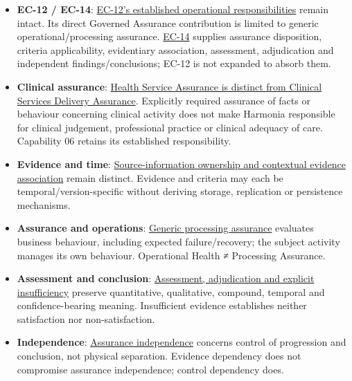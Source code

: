\begin{itemize}

\item 
\textbf{EC-12 /\allowbreak{} EC-14}: \hyperref[rad:enterprise:202]{EC-12's established operational responsibilities} remain intact. Its direct Governed Assurance contribution is limited to generic operational/\allowbreak{}processing assurance. \hyperref[rad:enterprise:224]{EC-14} supplies assurance disposition, criteria applicability, evidentiary association, assessment, adjudication and independent findings/\allowbreak{}conclusions; EC-12 is not expanded to absorb them.



\item 
\textbf{Clinical assurance}: \hyperref[rad:business:1102]{Health Service Assurance is distinct from Clinical Services Delivery Assurance}. Explicitly required assurance of facts or behaviour concerning clinical activity does not make Harmonia responsible for clinical judgement, professional practice or clinical adequacy of care. Capability 06 retains its established responsibility.



\item 
\textbf{Evidence and time}: \hyperref[rad:enabling:728]{Source-information ownership and contextual evidence association} remain distinct. Evidence and criteria may each be temporal/\allowbreak{}version-specific without deriving storage, replication or persistence mechanisms.



\item 
\textbf{Assurance and operations}: \hyperref[rad:enabling:716]{Generic processing assurance} evaluates business behaviour, including expected failure/\allowbreak{}recovery; the subject activity manages its own behaviour. Operational Health ≠ Processing Assurance.



\item 
\textbf{Assessment and conclusion}: \hyperref[rad:enabling:742]{Assessment, adjudication and explicit insufficiency} preserve quantitative, qualitative, compound, temporal and confidence-bearing meaning. Insufficient evidence establishes neither satisfaction nor non-satisfaction.



\item 
\textbf{Independence}: \hyperref[rad:enabling:753]{Assurance independence} concerns control of progression and conclusion, not physical separation. Evidence dependency does not compromise assurance independence; control dependency does.



\end{itemize}
\label{rad:assurance-strategy:88}
